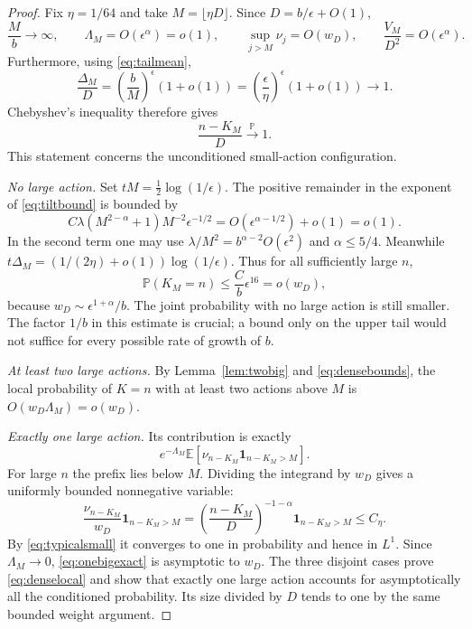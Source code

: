 \documentclass[11pt,a4paper]{article}
\numberwithin{equation}{section}
\theoremstyle{definition}
\theoremstyle{remark}
\newcommand{\E}{\mathbb E}
\newcommand{\Prob}{\mathbb P}
\newcommand{\ee}{\epsilon}
\newcommand{\ind}{\mathbf1}
\newcommand{\pto}{\xrightarrow{\Prob}}
\begin{document}
\begin{proof}
Fix $\eta=1/64$ and take $M=\lfloor\eta D\rfloor$. Since
$D=b/\ee+O(1)$,
\begin{equation}\label{eq:densebounds}
 \frac Mb\longrightarrow\infty,\qquad
 \Lambda_M=O(\ee^\alpha)=o(1),\qquad
 \sup_{j>M}\nu_j=O(w_D),\qquad
 \frac{V_M}{D^2}=O(\ee^\alpha).
\end{equation}
Furthermore, using \eqref{eq:tailmean},
\begin{equation}\label{eq:Deltaratio}
 \frac{\Delta_M}{D}
 =\left(\frac bM\right)^\ee(1+o(1))
 =\left(\frac\ee\eta\right)^\ee(1+o(1))\longrightarrow1.
\end{equation}
Chebyshev's inequality therefore gives
\begin{equation}\label{eq:typicalsmall}
 \frac{n-K_M}{D}\pto1.
\end{equation}
This statement concerns the unconditioned small-action configuration.

\smallskip\noindent\emph{No large action.}
Set $tM=\tfrac12\log(1/\ee)$. The positive remainder in the exponent
of \eqref{eq:tiltbound} is bounded by
\[
 C\lambda(M^{2-\alpha}+1)M^{-2}\ee^{-1/2}
 =O(\ee^{\alpha-1/2})+o(1)=o(1).
\]
In the second term one may use
$\lambda/M^2=b^{\alpha-2}O(\ee^2)$ and $\alpha\le5/4$.
Meanwhile $t\Delta_M=(1/(2\eta)+o(1))\log(1/\ee)$.
Thus for all sufficiently large $n$,
\begin{equation}\label{eq:nobig}
 \Prob(K_M=n)\le\frac Cb\ee^{16}=o(w_D),
\end{equation}
because $w_D\sim\ee^{1+\alpha}/b$. The joint probability with no large
action is still smaller. The factor $1/b$ in this estimate is crucial;
a bound only on the upper tail would not suffice for every possible rate
of growth of $b$.

\smallskip\noindent\emph{At least two large actions.}
By Lemma~\ref{lem:twobig} and \eqref{eq:densebounds}, the local probability
of $K=n$ with at least two actions above $M$ is
$O(w_D\Lambda_M)=o(w_D)$.

\smallskip\noindent\emph{Exactly one large action.}
Its contribution is exactly
\begin{equation}\label{eq:onebigexact}
 e^{-\Lambda_M}\E\left[
   \nu_{n-K_M}\ind_{n-K_M>M}\right].
\end{equation}
For large $n$ the prefix lies below $M$. Dividing the integrand by $w_D$
gives a uniformly bounded nonnegative variable:
\[
 \frac{\nu_{n-K_M}}{w_D}\ind_{n-K_M>M}
 =\left(\frac{n-K_M}{D}\right)^{-1-\alpha}
       \ind_{n-K_M>M}\le C_\eta.
\]
By \eqref{eq:typicalsmall} it converges to one in probability and hence in
$L^1$. Since $\Lambda_M\to0$, \eqref{eq:onebigexact} is asymptotic to
$w_D$. The three disjoint cases prove \eqref{eq:denselocal} and show that
exactly one large action accounts for asymptotically all the conditioned
probability. Its size divided by $D$ tends to one by the same bounded
weight argument.


\end{proof}
\end{document}
